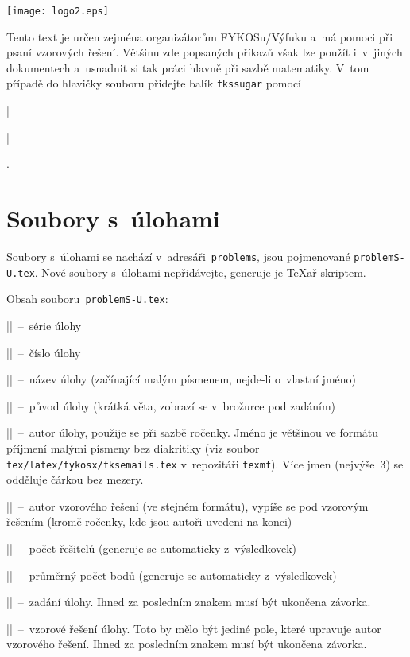\documentclass[fykos]{fksbase}
\newenvironment{texsource}
	{\VerbatimEnvironment\begin{mdframed}[backgroundcolor=mintedbg]%
		\hskip-16pt\begin{texminted}}
	{\end{texminted}\hskip-40pt\end{mdframed}}
\begin{document}
\begin{center}
	\texttt{[image: logo2.eps]}
	\hspace{10pt}
	\vskip0.6cm
\end{center}

Tento text je určen zejména organizátorům FYKOSu/Výfuku a~má pomoci při psaní
vzorových řešení. Většinu zde popsaných příkazů však lze použít i~v~jiných
dokumentech a~usnadnit si tak práci hlavně při sazbě matematiky. V~tom případě
do hlavičky souboru přidejte balík \texttt{fkssugar}
pomocí~{\texinline|\usepackage{fkssugar}|}.

\section{Soubory s~úlohami}

Soubory s~úlohami se nachází v~adresáři~\texttt{problems}, jsou pojmenované
\texttt{problemS-U.tex}. Nové soubory s~úlohami nepřidávejte, generuje je TeXař
skriptem.

\begin{texsource}
\probsolution{%
}
\end{texsource}

Obsah souboru~\texttt{problemS-U.tex}:
\begin{compactitem}
	\item \texinline|\probbatch|~--~série úlohy
	\item \texinline|\probno|~--~číslo úlohy
	\item \texinline|\probname|~--~název úlohy (začínající malým písmenem, nejde-li
		o~vlastní jméno)
	\item \texinline|\proborigin|~--~původ úlohy (krátká věta, zobrazí se v~brožurce pod
		zadáním)
	\item \texinline|\probauthors|~--~autor úlohy, použije se při sazbě ročenky. Jméno
	je většinou ve formátu příjmení malými písmeny bez diakritiky (viz soubor
	\texttt{tex/latex/fykosx/fksemails.tex} v~repozitáři \texttt{texmf}). Více jmen
	(nejvýše~3) se odděluje čárkou bez mezery.
	\item \texinline|\probsolauthors|~--~autor vzorového řešení (ve stejném formátu),
		vypíše se pod vzorovým řešením (kromě ročenky, kde jsou autoři uvedeni na konci)
	\item \texinline|\probsolvers|~--~počet řešitelů (generuje se automaticky
		z~výsledkovek)
	\item \texinline|\probavg|~--~průměrný počet bodů (generuje se automaticky
		z~výsledkovek)
	\item \texinline|\probtask|~--~zadání úlohy. Ihned za posledním znakem musí
	být ukončena závorka.
	\item \texinline|\probsolution|~--~vzorové řešení úlohy. Toto by mělo být jediné
		pole, které upravuje autor vzorového řešení. Ihned za posledním znakem musí být
		ukončena závorka.
\end{compactitem}
\end{document}
